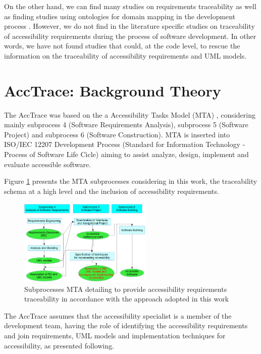 \documentclass[10pt, conference, compsocconf]{IEEEtran}
\begin{document}
On the other hand, we can find many studies on requirements traceability \cite{5970169,292398,5485417,6405269}
as well as finding studies using 
ontologies for domain mapping in the development process \cite{5223183,6511842,4148940,5362244}. However, we do not find in the literature specific studies on traceability of
accessibility requirements during the process of software development. 
In other words, we have not found studies that could, at the code level, to rescue the information on the traceability of accessibility 
requirements and UML models.


\section{AccTrace: Background Theory}

The AccTrace was based on the a Accessibility Tasks Model (MTA) 
\cite {maia:10}, considering mainly  subprocess 4 (Software Requirements Analysis), subprocess 5
(Software Project) and subprocess 6 (Software Construction). MTA is inserted into ISO/IEC 12207 Development 
Process (Standard for Information Technology - Process of Software Life Cicle) aiming to assist analyze, 
design, implement and evaluate accessible software.

Figure \ref{fig:figmagica} presents the MTA subprocesses considering in this work, the traceability schema
at a high level and the inclusion of accessibility requirements.

\begin{figure}[!t]
\centering
\includegraphics[width=2.5in]{img/figuramagica.png}
\caption{Subprocesses MTA detailing to provide 
accessibility requirements traceability in accordance with the approach adopted in this work}
\label{fig:figmagica}
\end{figure}

The AccTrace assumes that the accessibility specialist is a member of the development team,
having the role of identifying the
accessibility requirements and join requirements,
UML models and implementation techniques for accessibility, as presented following. 
\end{document}
